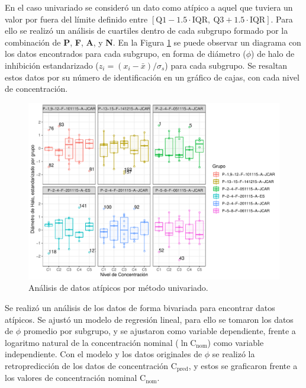 \documentclass{article}
\begin{document}
\noindent
En el caso univariado se consideró un dato como atípico a aquel que tuviera un valor por fuera del límite definido entre $\left[\mathrm{Q1}-1.5\cdot\mathrm{IQR},~\mathrm{Q3}+1.5\cdot\mathrm{IQR}\right]$. Para ello se realizó un análisis de cuartiles dentro de cada subgrupo formado por la combinación de \textbf{P}, \textbf{F}, \textbf{A}, y \textbf{N}. En la Figura \ref{Fig:1} se puede observar un diagrama con los datos encontrados para cada subgrupo, en forma de diámetro ($\phi$) de halo de inhibición estandarizado ($ z_{i} = \left(x_i - \bar{x}\right)/\sigma_{s}$) para cada subgrupo. Se resaltan estos datos por su número de identificación en un gráfico de cajas, con cada nivel de concentración. \\


\begin{figure}[H]
	\centering
	\includegraphics[width=1\linewidth]{Figuras/01_Outliers_identificados.pdf}
	\caption[Se muestran los datos atípicos como aquellos con un rango mayor a 1.5 IQR en su grupo principal]{Análisis de datos atípicos por método univariado.}
	\label{Fig:1}
\end{figure}

Se realizó un análisis de los datos de forma bivariada para encontrar datos atípicos. Se ajustó un modelo de regresión lineal, para ello se tomaron los datos de $\phi$ promedio por subgrupo, y se ajustaron como variable dependiente, frente a logaritmo natural de la concentración nominal ($\ln{\mathrm{C_{nom}}} $) como variable independiente. Con el modelo y los datos originales de $\phi$ se realizó la retropredicción de los datos de concentración $ \mathrm{C_{pred}} $, y estos se graficaron frente a los valores de concentración nominal $\mathrm{C_{nom}}$.\\
\end{document}
